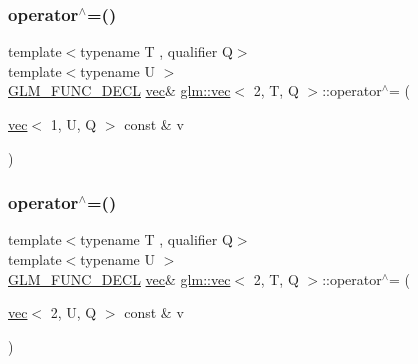 \mbox{\label{structglm_1_1vec_3_012_00_01_t_00_01_q_01_4_a78bce23dda849b6e10228af66f698597}} 
\subsubsection{\texorpdfstring{operator$^\wedge$=()}{operator^=()}\hspace{0.1cm}{\footnotesize\ttfamily [2/6]}}
{\footnotesize\ttfamily template$<$typename T , qualifier Q$>$ \\
template$<$typename U $>$ \\
\mbox{\hyperlink{setup_8hpp_ab2d052de21a70539923e9bcbf6e83a51}{G\+L\+M\+\_\+\+F\+U\+N\+C\+\_\+\+D\+E\+CL}} \mbox{\hyperlink{structglm_1_1vec}{vec}}\& \mbox{\hyperlink{structglm_1_1vec}{glm\+::vec}}$<$ 2, T, Q $>$\+::operator$^\wedge$= (\begin{DoxyParamCaption}\item[{\mbox{\hyperlink{structglm_1_1vec}{vec}}$<$ 1, U, Q $>$ const \&}]{v }\end{DoxyParamCaption})}

\mbox{\label{structglm_1_1vec_3_012_00_01_t_00_01_q_01_4_aee4803e0202a355622479781010b203b}} 
\subsubsection{\texorpdfstring{operator$^\wedge$=()}{operator^=()}\hspace{0.1cm}{\footnotesize\ttfamily [3/6]}}
{\footnotesize\ttfamily template$<$typename T , qualifier Q$>$ \\
template$<$typename U $>$ \\
\mbox{\hyperlink{setup_8hpp_ab2d052de21a70539923e9bcbf6e83a51}{G\+L\+M\+\_\+\+F\+U\+N\+C\+\_\+\+D\+E\+CL}} \mbox{\hyperlink{structglm_1_1vec}{vec}}\& \mbox{\hyperlink{structglm_1_1vec}{glm\+::vec}}$<$ 2, T, Q $>$\+::operator$^\wedge$= (\begin{DoxyParamCaption}\item[{\mbox{\hyperlink{structglm_1_1vec}{vec}}$<$ 2, U, Q $>$ const \&}]{v }\end{DoxyParamCaption})}

